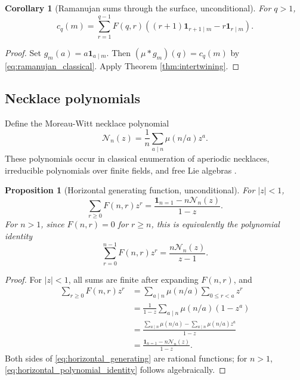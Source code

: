 \documentclass[11pt]{amsart}
\numberwithin{equation}{section}
\theoremstyle{plain}
\newtheorem{proposition}[theorem]{Proposition}
\newtheorem{corollary}[theorem]{Corollary}
\theoremstyle{definition}
\theoremstyle{remark}
\newcommand{\one}{\mathbf 1}
\newcommand{\mob}{\mu}
\newcommand{\Fsurf}{F}
\newcommand{\Neck}{\mathcal N}
\begin{document}
\begin{corollary}[Ramanujan sums through the surface, unconditional]
\label{cor:ramanujan_surface}
For \(q>1\),
\begin{equation}
c_q(m)=\sum_{r=1}^{q-1}\Fsurf(q,r)\left((r+1)\one_{r+1\mid m}-r\one_{r\mid m}\right).
\label{eq:ramanujan_surface}
\end{equation}
\end{corollary}

\begin{proof}
Set \(g_m(a)=a\one_{a\mid m}\).  Then \((\mob*g_m)(q)=c_q(m)\) by \eqref{eq:ramanujan_classical}.  Apply Theorem \ref{thm:intertwining}.
\end{proof}

\subsection{Necklace polynomials}
\label{subsec:necklace}

Define the Moreau-Witt necklace polynomial
\begin{equation}
\Neck_n(z)=\frac1n\sum_{a\mid n}\mob(n/a)z^a.
\label{eq:necklace_def}
\end{equation}
These polynomials occur in classical enumeration of aperiodic necklaces, irreducible polynomials over finite fields, and free Lie algebras \cite{Stanley2012,Reutenauer1993}.

\begin{proposition}[Horizontal generating function, unconditional]
\label{prop:necklace_generating}
For \(|z|<1\),
\begin{equation}
\sum_{r\ge0}\Fsurf(n,r)z^r=\frac{\one_{n=1}-n\Neck_n(z)}{1-z}.
\label{eq:horizontal_generating}
\end{equation}
For \(n>1\), since \(\Fsurf(n,r)=0\) for \(r\ge n\), this is equivalently the polynomial identity
\begin{equation}
\sum_{r=0}^{n-1}\Fsurf(n,r)z^r=\frac{n\Neck_n(z)}{z-1}.
\label{eq:horizontal_polynomial_identity}
\end{equation}
\end{proposition}

\begin{proof}
For \(|z|<1\), all sums are finite after expanding \(\Fsurf(n,r)\), and
\begin{align}
\sum_{r\ge0}\Fsurf(n,r)z^r
&=\sum_{a\mid n}\mob(n/a)\sum_{0\le r<a}z^r \\
&=\frac1{1-z}\sum_{a\mid n}\mob(n/a)(1-z^a) \\
&=\frac{\sum_{a\mid n}\mob(n/a)-\sum_{a\mid n}\mob(n/a)z^a}{1-z} \\
&=\frac{\one_{n=1}-n\Neck_n(z)}{1-z}.
\label{eq:necklace_proof}
\end{align}
Both sides of \eqref{eq:horizontal_generating} are rational functions; for \(n>1\), \eqref{eq:horizontal_polynomial_identity} follows algebraically.
\end{proof}
\end{document}
